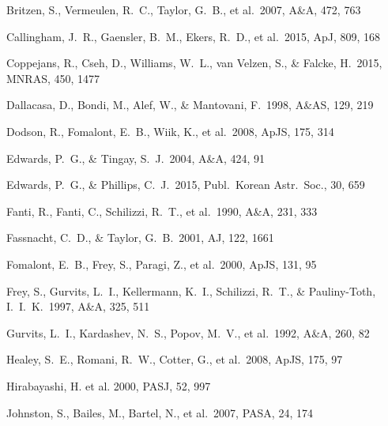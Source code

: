 \documentclass{pasa}%
\begin{document}
\begin{thebibliography}{}

Britzen, S., Vermeulen, R.~C., Taylor, G.~B., et al.\ 2007, A\&A, 472, 763 

Callingham, J.~R., Gaensler, B.~M., Ekers, R.~D., et al.\ 2015, ApJ, 809, 168 

Coppejans, R., Cseh, D., Williams, W.~L., van Velzen, S., \& Falcke, H.\ 2015, MNRAS, 450, 1477 

Dallacasa, D., Bondi, M., Alef, W., \& Mantovani, F.\ 1998, A\&AS, 129, 219 

Dodson, R., Fomalont, E.~B., Wiik, K., et al.\ 2008, ApJS, 175, 314 

Edwards, P.~G., \& Tingay, S.~J.\ 2004, A\&A, 424, 91 

Edwards, P.~G., \& Phillips, C.~J.\ 2015, Publ.\ Korean Astr.\ Soc., 30, 659 

Fanti, R., Fanti, C., Schilizzi, R.~T., et al.\ 1990, A\&A, 231, 333 

Fassnacht, C.~D., \& Taylor, G.~B.\ 2001, AJ, 122, 1661 

Fomalont, E.~B., Frey, S., Paragi, Z., et al.\ 2000, ApJS, 131, 95 

Frey, S., Gurvits, L.~I., Kellermann, K.~I., Schilizzi, R.~T., \& Pauliny-Toth, I.~I.~K.\ 1997, A\&A, 325, 511 

Gurvits, L.~I., Kardashev, N.~S., Popov, M.~V., et al.\ 1992, A\&A, 260, 82 

Healey, S.~E., Romani, R.~W., Cotter, G., et al.\ 2008, ApJS, 175, 97 

Hirabayashi, H. et al. 2000, PASJ, 52, 997

Johnston, S., Bailes, M., Bartel, N., et al.\ 2007, PASA, 24, 174 


\end{thebibliography}
\end{document}

